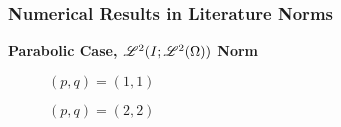 \begin{frame}
    \frametitle{Numerical Results in Literature Norms}

    \vspace*{\fill}
    \begin{center}
        {\color{\accentcolor} \Large \textbf{Parabolic Case, $\mathscr{L}^{2}(I; \mathscr{L}^{2}(\Omega))$ Norm}}
    \end{center}

    \vspace*{\fill}

    \begin{multicols}{2}

        \begin{center}
            \begin{minipage}{0.4\textwidth}
                \begin{figure}[!ht]
                    \caption{$\left( p, q  \right) = \left( 1, 1  \right)$}
                    \label{fig:p_1_1_par_l2l2}
                    
                \end{figure}
            \end{minipage}
        \end{center}

        \vfill\null
        \columnbreak

        \begin{center}
            \begin{minipage}{0.4\textwidth}
                \begin{figure}[!ht]
                    \caption{$\left( p, q  \right) = \left( 2, 2  \right)$}
                    \label{fig:p_2_2_par_l2l2}
                    
                \end{figure}
            \end{minipage}
        \end{center}

    \end{multicols}
    \vspace*{\fill}
    
\end{frame}

